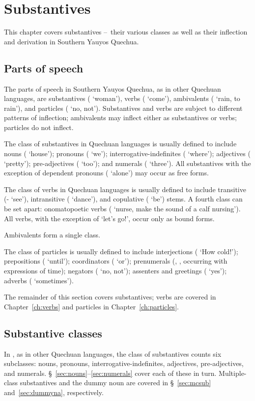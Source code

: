 \chapter{Substantives}\label{ch:substantives}
This chapter covers substantives --~their various classes as well as their inflection and derivation in Southern Yauyos Quechua.

\section{Parts of speech}
The parts of speech in Southern Yauyos Quechua, as in other Quechuan languages, are substantives ( ‘woman’), verbs ( ‘come’), ambivalents ( ‘rain, to rain’), and particles ( ‘no, not’). Substantives and verbs are subject to different patterns of inflection; ambivalents may inflect either as substantives or verbs; particles do not inflect.

The class of substantives in Quechuan languages is usually defined to include nouns ( ‘house’); pronouns ( ‘we’); interrogative-indefinites ( ‘where’); adjectives ( ‘pretty’); pre-adjectives ( ‘too’); and numerals ( ‘three’). All substantives with the exception of dependent pronouns ( ‘alone’) may occur as free forms.

The class of verbs in Quechuan languages is usually defined to include transitive (- ‘see’), intransitive ( ‘dance’), and copulative ( ‘be’) stems. A fourth class can be set apart: onomatopoetic verbs ( ‘nurse, make the sound of a calf nursing’). All verbs, with the exception of  ‘let’s go!’, occur only as bound forms.

Ambivalents form a single class.

The class of particles is usually defined to include interjections ( ‘How cold!’); prepositions ( ‘until’); coordinators ( ‘or’); prenumerals (, , occurring with expressions of time); negators ( ‘no, not’); assenters and greetings ( ‘yes’); adverbs ( ‘sometimes’).

The remainder of this section covers substantives; verbs are covered in Chapter~\ref{ch:verbs} and particles in Chapter~\ref{ch:particles}.

\section{Substantive classes}
In \SYQ, as in other Quechuan languages, the class of substantives counts six subclasses: nouns, pronouns, interrogative-indefinites, adjectives, pre-adjectives, and numerals. §~\ref{sec:nouns}--\ref{sec:numerals} cover each of these in turn. Multiple-class substantives and the dummy noun  are covered in §~\ref{sec:mcsub} and~\ref{sec:dummyna}, respectively.

